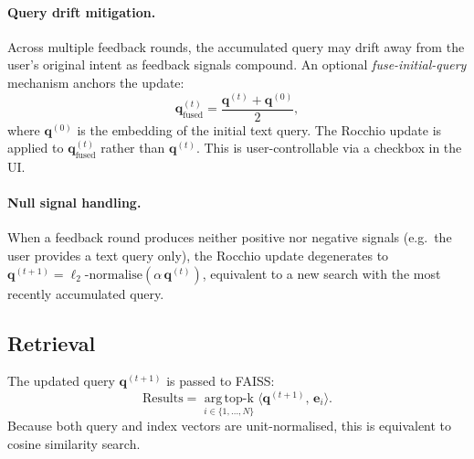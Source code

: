 \documentclass[12pt,a4paper]{article}
\newcommand{\vq}{\bm{q}}
\newcommand{\ve}{\bm{e}}
\begin{document}
\paragraph{Query drift mitigation.}
Across multiple feedback rounds, the accumulated query may drift away from the
user's original intent as feedback signals compound. An optional
\emph{fuse-initial-query} mechanism anchors the update:
\begin{equation}
  \vq^{(t)}_{\text{fused}} = \frac{\vq^{(t)} + \vq^{(0)}}{2},
\end{equation}
where $\vq^{(0)}$ is the embedding of the initial text query. The Rocchio
update is applied to $\vq^{(t)}_{\text{fused}}$ rather than $\vq^{(t)}$.
This is user-controllable via a checkbox in the UI.

\paragraph{Null signal handling.}
When a feedback round produces neither positive nor negative signals
(e.g.\ the user provides a text query only), the Rocchio update degenerates
to $\vq^{(t+1)} = \ell_2\text{-normalise}(\alpha\,\vq^{(t)})$, equivalent
to a new search with the most recently accumulated query.

\subsection{Retrieval}

The updated query $\vq^{(t+1)}$ is passed to FAISS:
\begin{equation}
  \text{Results} = \operatorname*{arg\,top\text{-}k}_{i \in \{1,\ldots,N\}}
    \langle \vq^{(t+1)},\, \ve_i \rangle.
\end{equation}
Because both query and index vectors are unit-normalised, this is equivalent
to cosine similarity search.
\end{document}
